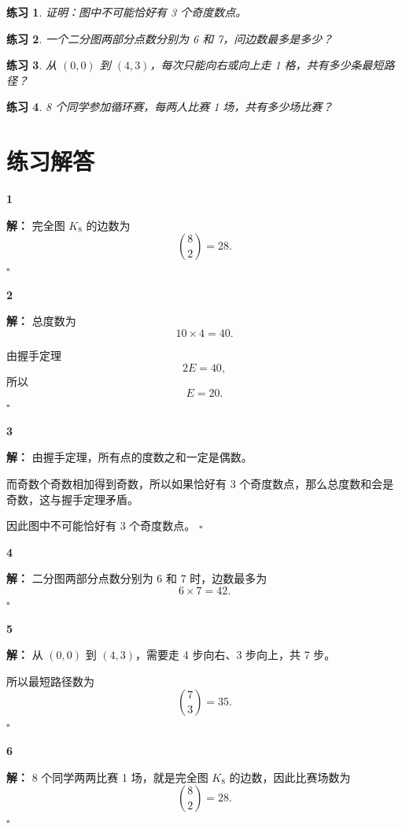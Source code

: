 \documentclass[11pt,a4paper,fontset=fandol]{ctexart}
\theoremstyle{formaltheorem}
\theoremstyle{formalexample}
\newtheorem{exercise}{练习}[section]
\newenvironment{solution}{\par\noindent\textbf{解：}}{\hfill$\square$\par}
\begin{document}
\begin{exercise}
证明：图中不可能恰好有 3 个奇度数点。
\end{exercise}

\begin{exercise}
一个二分图两部分点数分别为 6 和 7，问边数最多是多少？
\end{exercise}

\begin{exercise}
从 $(0,0)$ 到 $(4,3)$，每次只能向右或向上走 1 格，共有多少条最短路径？
\end{exercise}

\begin{exercise}
8 个同学参加循环赛，每两人比赛 1 场，共有多少场比赛？
\end{exercise}

\newpage
\appendix
\section{练习解答}

\textbf{1}\begin{solution}
完全图 $K_8$ 的边数为
\[
\binom82=28.
\]
\end{solution}

\textbf{2}\begin{solution}
总度数为
\[
10\times 4=40.
\]

由握手定理
\[
2E=40,
\]
所以
\[
E=20.
\]
\end{solution}

\textbf{3}\begin{solution}
由握手定理，所有点的度数之和一定是偶数。

而奇数个奇数相加得到奇数，所以如果恰好有 3 个奇度数点，那么总度数和会是奇数，这与握手定理矛盾。

因此图中不可能恰好有 3 个奇度数点。
\end{solution}

\textbf{4}\begin{solution}
二分图两部分点数分别为 6 和 7 时，边数最多为
\[
6\times 7=42.
\]
\end{solution}

\textbf{5}\begin{solution}
从 $(0,0)$ 到 $(4,3)$，需要走 4 步向右、3 步向上，共 7 步。

所以最短路径数为
\[
\binom73=35.
\]
\end{solution}

\textbf{6}\begin{solution}
8 个同学两两比赛 1 场，就是完全图 $K_8$ 的边数，因此比赛场数为
\[
\binom82=28.
\]
\end{solution}
\end{document}
